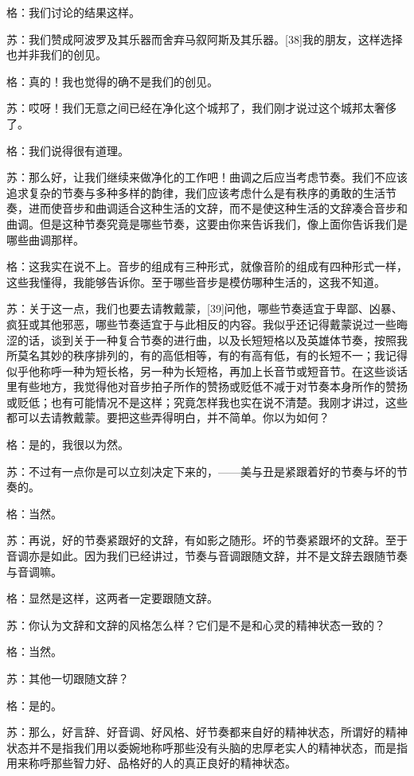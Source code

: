 \documentclass[12pt,oneside]{book}
\begin{document}
格：我们讨论的结果这样。

苏：我们赞成阿波罗及其乐器而舍弃马叙阿斯及其乐器。[38]我的朋友，这样选择也并非我们的创见。

格：真的！我也觉得的确不是我们的创见。

苏：哎呀！我们无意之间已经在净化这个城邦了，我们刚才说过这个城邦太奢侈了。

格：我们说得很有道理。

苏：那么好，让我们继续来做净化的工作吧！曲调之后应当考虑节奏。我们不应该追求复杂的节奏与多种多样的韵律，我们应该考虑什么是有秩序的勇敢的生活节奏，进而使音步和曲调适合这种生活的文辞，而不是使这种生活的文辞凑合音步和曲调。但是这种节奏究竟是哪些节奏，这要由你来告诉我们，像上面你告诉我们是哪些曲调那样。

格：这我实在说不上。音步的组成有三种形式，就像音阶的组成有四种形式一样，这些我懂得，我能够告诉你。至于哪些音步是模仿哪种生活的，这我不知道。

苏：关于这一点，我们也要去请教戴蒙，[39]问他，哪些节奏适宜于卑鄙、凶暴、疯狂或其他邪恶，哪些节奏适宜于与此相反的内容。我似乎还记得戴蒙说过一些晦涩的话，谈到关于一种复合节奏的进行曲，以及长短短格以及英雄体节奏，按照我所莫名其妙的秩序排列的，有的高低相等，有的有高有低，有的长短不一；我记得似乎他称呼一种为短长格，另一种为长短格，再加上长音节或短音节。在这些谈话里有些地方，我觉得他对音步拍子所作的赞扬或贬低不减于对节奏本身所作的赞扬或贬低；也有可能情况不是这样；究竟怎样我也实在说不清楚。我刚才讲过，这些都可以去请教戴蒙。要把这些弄得明白，并不简单。你以为如何？

格：是的，我很以为然。

苏：不过有一点你是可以立刻决定下来的，——美与丑是紧跟着好的节奏与坏的节奏的。

格：当然。

苏：再说，好的节奏紧跟好的文辞，有如影之随形。坏的节奏紧跟坏的文辞。至于音调亦是如此。因为我们已经讲过，节奏与音调跟随文辞，并不是文辞去跟随节奏与音调嘛。

格：显然是这样，这两者一定要跟随文辞。

苏：你认为文辞和文辞的风格怎么样？它们是不是和心灵的精神状态一致的？

格：当然。

苏：其他一切跟随文辞？

格：是的。

苏：那么，好言辞、好音调、好风格、好节奏都来自好的精神状态，所谓好的精神状态并不是指我们用以委婉地称呼那些没有头脑的忠厚老实人的精神状态，而是指用来称呼那些智力好、品格好的人的真正良好的精神状态。
\end{document}
